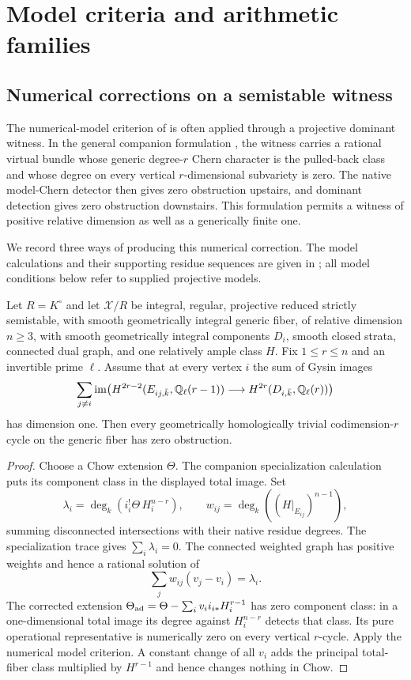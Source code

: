\section{Model criteria and arithmetic families}\label{sec:models}

\subsection{Numerical corrections on a semistable witness}

The numerical-model criterion of  is often
applied through a projective dominant witness. In the general
companion formulation \cite{InternalEndpoints}, the witness carries
a rational virtual bundle whose generic degree-$r$ Chern character
is the pulled-back class and whose degree on every vertical
$r$-dimensional subvariety is zero. The native model-Chern detector
then gives zero obstruction upstairs, and dominant detection gives
zero obstruction downstairs. This formulation permits a witness
of positive relative dimension as well as a generically finite one.

We record three ways of producing this numerical correction.
The model calculations and their supporting residue sequences are
given in \cite{InternalModelCriteria}; all model conditions below
refer to supplied projective models.

\begin{proposition}\label{prop:scalar-model}
Let $R=K^\circ$ and let $\mathcal X/R$ be integral, regular,
projective reduced strictly semistable, with smooth geometrically
integral generic fiber,
of relative dimension $n\geq3$, with smooth geometrically integral
components $D_i$, smooth closed strata, connected dual graph, and
one relatively ample class $H$. Fix $1\leq r\leq n$ and an
invertible prime $\ell$. Assume that at every vertex $i$ the sum
of Gysin images
\[
 \sum_{j\ne i}\operatorname{im}\bigl(
 H^{2r-2}(E_{ij,\bar k},\mathbb Q_\ell(r-1))
       \longrightarrow H^{2r}(D_{i,\bar k},\mathbb Q_\ell(r))\bigr)
\]
has dimension one. Then every geometrically homologically trivial
codimension-$r$ cycle on the generic fiber has zero obstruction.
\end{proposition}

\begin{proof}
Choose a Chow extension $\Theta$. The companion specialization
calculation puts its component class in the displayed total image.
Set
\[
 \lambda_i=\deg_k(i_i^!\Theta\,H_i^{n-r}),\qquad
 w_{ij}=\deg_k((H|_{E_{ij}})^{n-1}),
\]
summing disconnected intersections with their native residue degrees.
The specialization trace gives $\sum_i\lambda_i=0$.
The connected weighted graph has positive weights and hence a rational
solution of
\[
 \sum_jw_{ij}(v_j-v_i)=\lambda_i.
\]
The corrected extension
$\Theta_{\rm ad}=\Theta-\sum_i v_i i_{i*}H_i^{r-1}$ has zero
component class: in a one-dimensional total image its degree against
$H_i^{n-r}$ detects that class. Its pure operational representative
is numerically zero on every vertical $r$-cycle. Apply the numerical
model criterion. A constant change of all $v_i$ adds the principal
total-fiber class multiplied by $H^{r-1}$ and hence changes nothing
in Chow.
\end{proof}

